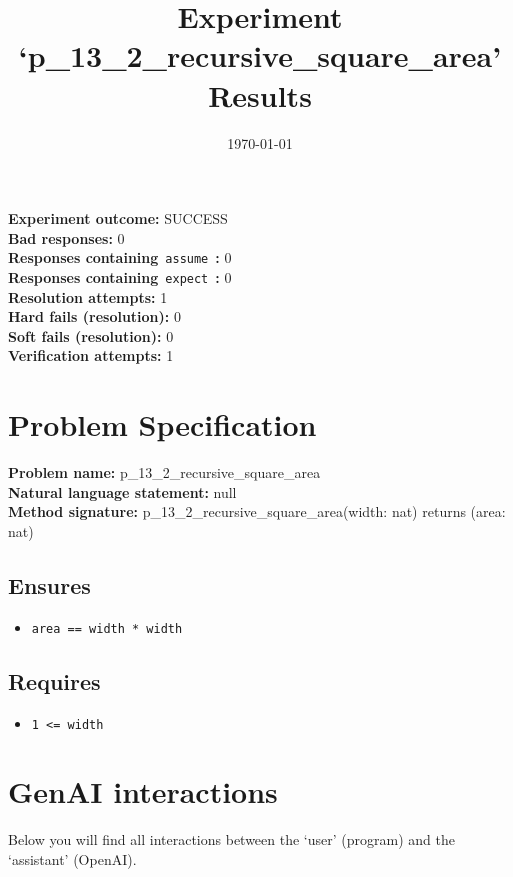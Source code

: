 \documentclass{article}
\begin{document}
\title{Experiment `p\_13\_2\_recursive\_square\_area' Results}
\author{\today}
\date{}
\maketitle
\textbf{Experiment outcome: }SUCCESS
\\\textbf{Bad responses: }0
\\\textbf{Responses containing}~\texttt{assume}~\textbf{: }0
\\\textbf{Responses containing}~\texttt{expect}~\textbf{: }0
\\\textbf{Resolution attempts: }1
\\\textbf{Hard fails (resolution): }0
\\\textbf{Soft fails (resolution): }0
\\\textbf{Verification attempts: }1
\section*{Problem Specification}
\textbf{Problem name: }p\_13\_2\_recursive\_square\_area
\\\textbf{Natural language statement: }null
\\\textbf{Method signature: }p\_13\_2\_recursive\_square\_area(width: nat) returns (area: nat)
\subsection*{Ensures}
\begin{itemize}
\item \texttt{area == width * width}
\end{itemize}
\subsection*{Requires}
\begin{itemize}
\item \texttt{1 <= width}
\end{itemize}
\clearpage
\section*{GenAI interactions}
Below you will find all interactions between the `user' (program) and the `assistant' (OpenAI).
\end{document}
